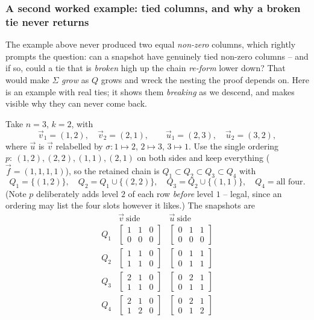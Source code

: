 \subsubsection*{A second worked example: tied columns, and why a broken tie never returns}

The example above never produced two equal \emph{non-zero} columns, which rightly
prompts the question: can a snapshot have genuinely tied non-zero columns -- and if
so, could a tie that is \emph{broken} high up the chain \emph{re-form} lower down?
That would make $\Sigma$ \emph{grow} as $Q$ grows and wreck the nesting the proof
depends on.  Here is an example with real ties; it shows them \emph{breaking} as we
descend, and makes visible why they can never come back.

Take $n=3$, $k=2$, with
\[
\vec v_1=(1,2),\quad \vec v_2=(2,1),
\qquad
\vec u_1=(2,3),\quad \vec u_2=(3,2),
\]
where $\vec u$ is $\vec v$ relabelled by $\sigma:1\mapsto2,\,2\mapsto3,\,3\mapsto1$.
Use the single ordering $p:\ (1,2),(2,2),(1,1),(2,1)$ on both sides and keep
everything ($\vec f=(1,1,1,1)$), so the retained chain is
$Q_1\subset Q_2\subset Q_3\subset Q_4$ with
\[
Q_1=\{(1,2)\},\quad Q_2=Q_1\cup\{(2,2)\},\quad
Q_3=Q_2\cup\{(1,1)\},\quad Q_4=\text{all four}.
\]
(Note $p$ deliberately adds level $2$ of each row \emph{before} level $1$ -- legal,
since an ordering may list the four slots however it likes.)  The snapshots are
\[
\renewcommand{\arraystretch}{2.4}
\begin{array}{c|c|c}
 & \vec v\ \text{side} & \vec u\ \text{side}\\\hline
Q_1 & \begin{bmatrix}1&1&0\\0&0&0\end{bmatrix}
    & \begin{bmatrix}0&1&1\\0&0&0\end{bmatrix}\\
Q_2 & \begin{bmatrix}1&1&0\\1&1&0\end{bmatrix}
    & \begin{bmatrix}0&1&1\\0&1&1\end{bmatrix}\\
Q_3 & \begin{bmatrix}2&1&0\\1&1&0\end{bmatrix}
    & \begin{bmatrix}0&2&1\\0&1&1\end{bmatrix}\\
Q_4 & \begin{bmatrix}2&1&0\\1&2&0\end{bmatrix}
    & \begin{bmatrix}0&2&1\\0&1&2\end{bmatrix}
\end{array}
\]
